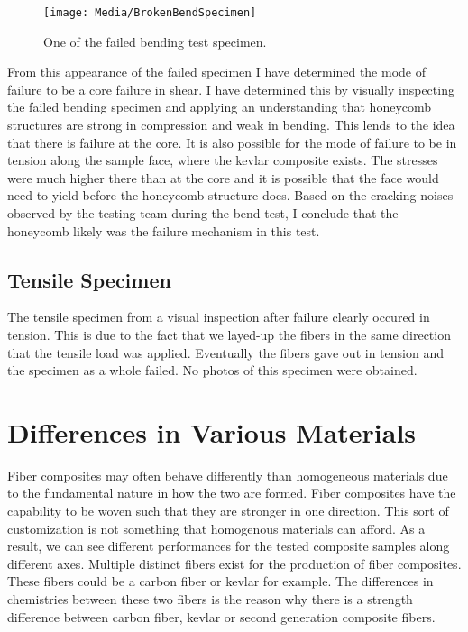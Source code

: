 \documentclass{article}
\begin{document}
\begin{figure}[H]
  \begin{center}
    \texttt{[image: Media/BrokenBendSpecimen]}
    \caption{One of the failed bending test specimen.}
    \label{fig:FailedBending1}
  \end{center}
\end{figure}

From this appearance of the failed specimen I have determined the mode of failure to be a core failure in shear. I have determined this by visually inspecting the failed bending specimen and applying an understanding that honeycomb structures are strong in compression and weak in bending. This lends to the idea that there is failure at the core. It is also possible for the mode of failure to be in tension along the sample face, where the kevlar composite exists. The stresses were much higher there than at the core and it is possible that the face would need to yield before the honeycomb structure does. Based on the cracking noises observed by the testing team during the bend test, I conclude that the honeycomb likely was the failure mechanism in this test.

\subsection{Tensile Specimen}
The tensile specimen from a visual inspection after failure clearly occured in tension. This is due to the fact that we layed-up the fibers in the same direction that the tensile load was applied. Eventually the fibers gave out in tension and the specimen as a whole failed. No photos of this specimen were obtained.

\section{Differences in Various Materials}
Fiber composites may often behave differently than homogeneous materials due to the fundamental nature in how the two are formed. Fiber composites have the capability to be woven such that they are stronger in one direction. This sort of customization is not something that homogenous materials can afford. As a result, we can see different performances for the tested composite samples along different axes. Multiple distinct fibers exist for the production of fiber composites. These fibers could be a carbon fiber or kevlar for example. The differences in chemistries between these two fibers is the reason why there is a strength difference between carbon fiber, kevlar or second generation composite fibers.
\end{document}

